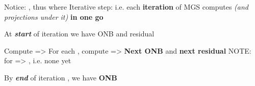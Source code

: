 \begin{itemize}
\begin{itemize}
                  \vItem
                        Notice: , thus
                        where 
                  \vItem
                        Iterative step:
                  \vItem
                        i.e. each \textbf{iteration } of MGS computes 
                        \emph{(and projections under it)} \textbf{in one go}
            \end{itemize}
      \vItem
            At \textbf{\emph{start}} of iteration 
            we have ONB
            and residual

            \begin{itemize}

                  \vItem
                        Compute
                        =>
                  \vItem
                        For each , compute
                        => 
                  \vItem
                        \textbf{Next ONB}  and
                        \textbf{next residual} 
                  \vItem
                        NOTE: for  =>
                        ,
                        i.e. none yet
            \end{itemize}
      \vItem
            By \textbf{\emph{end}} of iteration , we have \textbf{ONB}


\end{itemize}
